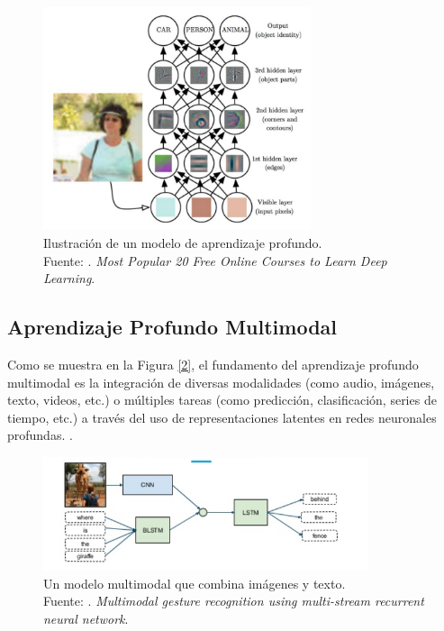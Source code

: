 \begin{figure}[!ht]
	\begin{center}
		\includegraphics[width=0.70\textwidth]{2/figures/deeplearning_machinelearning2.jpg}
		\caption[Ilustración de un modelo de aprendizaje profundo]{Ilustración de un modelo de aprendizaje profundo.\\
		Fuente: \cite{tec_cook2018deeplearning}. \textit{Most Popular 20 Free Online Courses to Learn Deep Learning}.}
		\label{2:fig6}
	\end{center}
\end{figure}


\subsection{Aprendizaje Profundo Multimodal}
Como se muestra en la Figura \ref{2}, el fundamento del aprendizaje profundo multimodal es la integración de diversas modalidades (como audio, imágenes, texto, videos, etc.) o múltiples tareas (como predicción, clasificación, series de tiempo, etc.) a través del uso de representaciones latentes en redes neuronales profundas. \parencite{bk_deng2018deeplearningnlp}.

\begin{figure}[!ht]
	\begin{center}
		\includegraphics[width=0.85\textwidth]{2/figures/multimodal_network.png}
		\caption[Un modelo multimodal que combina imágenes y texto]{Un modelo multimodal que combina imágenes y texto.\\
		Fuente: \cite{tec_nishida2015multimodal}. \textit{Multimodal gesture recognition using multi-stream recurrent neural network}.}
		\label{2:fig7}
	\end{center}
\end{figure}

